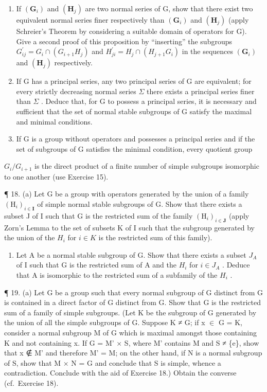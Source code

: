 \begin{enumerate}
\def\labelenumi{(\alph{enumi})}
\item
  If \((\mathbf{G}_{i})\) and \((\mathbf{H}_{j})\) are two normal series of G, show that there exist two equivalent normal series finer respectively than \((\mathbf{G}_{i})\) and \((\mathbf{H}_{j})\) (apply Schreier's Theorem by considering a suitable domain of operators for G). Give a second proof of this proposition by ``inserting'' the subgroups \(G_{ij}^{\prime} = G_{i} \cap (G_{i+1}H_{j})\) and \(H_{ji}^{\prime} = H_{j} \cap (H_{j+1}G_{i})\) in the sequences \((\mathbf{G}_{i})\) and \((\mathbf{H}_{j})\) respectively.
\item
  If G has a principal series, any two principal series of G are equivalent; for every strictly decreasing normal series \(\Sigma\) there exists a principal series finer than \(\Sigma\) . Deduce that, for G to possess a principal series, it is necessary and sufficient that the set of normal stable subgroups of G satisfy the maximal and minimal conditions.
\item
  If G is a group without operators and possesses a principal series and if the set of subgroups of G satisfies the minimal condition, every quotient group
\end{enumerate}

\(G_{i}/G_{i+1}\) is the direct product of a finite number of simple subgroups isomorphic to one another (use Exercise 15).

¶ 18. (a) Let G be a group with operators generated by the union of a family \((\mathrm{H}_{i})_{i\in\mathbf{I}}\) of simple normal stable subgroups of G. Show that there exists a subset J of I such that G is the restricted sum of the family \((\mathrm{H}_{i})_{i\in\mathbf{J}}\) (apply Zorn's Lemma to the set of subsets K of I such that the subgroup generated by the union of the \(H_{i}\) for \(i\in K\) is the restricted sum of this family).

\begin{enumerate}
\def\labelenumi{(\alph{enumi})}
\setcounter{enumi}{1}
\tightlist
\item
  Let A be a normal stable subgroup of G. Show that there exists a subset \(J_{A}\) of I such that G is the restricted sum of A and the \(H_{i}\) for \(i \in J_{A}\) . Deduce that A is isomorphic to the restricted sum of a subfamily of the \(H_{i}\) .
\end{enumerate}

¶ 19. (a) Let G be a group such that every normal subgroup of G distinct from G is contained in a direct factor of G distinct from G. Show that G is the restricted sum of a family of simple subgroups. (Let K be the subgroup of G generated by the union of all the simple subgroups of G. Suppose K ≠ G; if x \ensuremath{\in} G = K, consider a normal subgroup M of G which is maximal amongst those containing K and not containing x. If G = M' × S, where M' contains M and S ≠ \{e\}, show that x ∉ M' and therefore M' = M; on the other hand, if N is a normal subgroup of S, show that M × N = G and conclude that S is simple, whence a contradiction. Conclude with the aid of Exercise 18.) Obtain the converse (cf.~Exercise 18).

